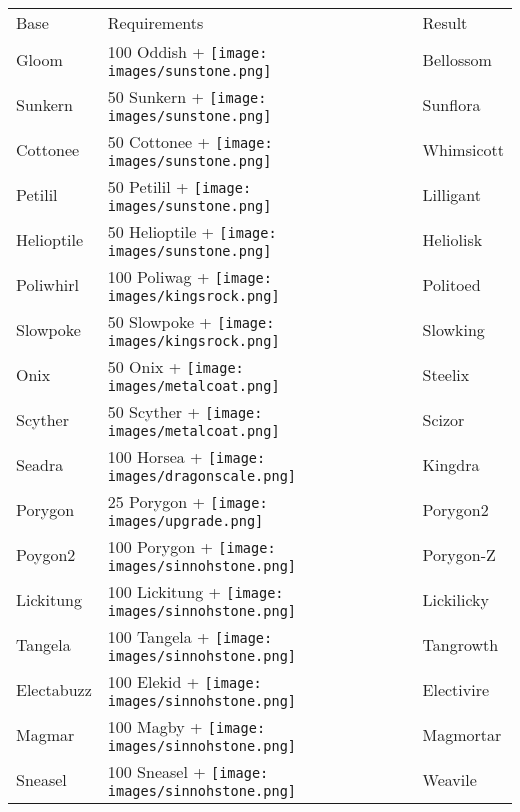 \begin{table}
\footnotesize
\centering
  \begin{tabular}{lll}
    Base & Requirements & Result \\
    \Midrule
    Gloom & 100 Oddish + \texttt{[image: images/sunstone.png]} & Bellossom \\
    Sunkern & 50 Sunkern + \texttt{[image: images/sunstone.png]} & Sunflora \\
    Cottonee & 50 Cottonee + \texttt{[image: images/sunstone.png]} & Whimsicott \\
    Petilil & 50 Petilil + \texttt{[image: images/sunstone.png]} & Lilligant \\
    Helioptile & 50 Helioptile + \texttt{[image: images/sunstone.png]} & Heliolisk \\
    Poliwhirl & 100 Poliwag + \texttt{[image: images/kingsrock.png]} & Politoed \\
    Slowpoke & 50 Slowpoke + \texttt{[image: images/kingsrock.png]} & Slowking \\
    Onix & 50 Onix + \texttt{[image: images/metalcoat.png]} & Steelix \\
    Scyther & 50 Scyther + \texttt{[image: images/metalcoat.png]} & Scizor \\
    Seadra & 100 Horsea + \texttt{[image: images/dragonscale.png]} & Kingdra \\
    Porygon & 25 Porygon + \texttt{[image: images/upgrade.png]} & Porygon2 \\
    Poygon2 & 100 Porygon + \texttt{[image: images/sinnohstone.png]} & Porygon-Z \\
    Lickitung & 100 Lickitung + \texttt{[image: images/sinnohstone.png]} & Lickilicky \\
    Tangela	& 100 Tangela + \texttt{[image: images/sinnohstone.png]} & Tangrowth \\
    Electabuzz & 100 Elekid + \texttt{[image: images/sinnohstone.png]} & Electivire	\\
    Magmar & 100 Magby + \texttt{[image: images/sinnohstone.png]} & Magmortar	\\
    Sneasel & 100 Sneasel + \texttt{[image: images/sinnohstone.png]} & Weavile	\\

\end{tabular}
\end{table}
